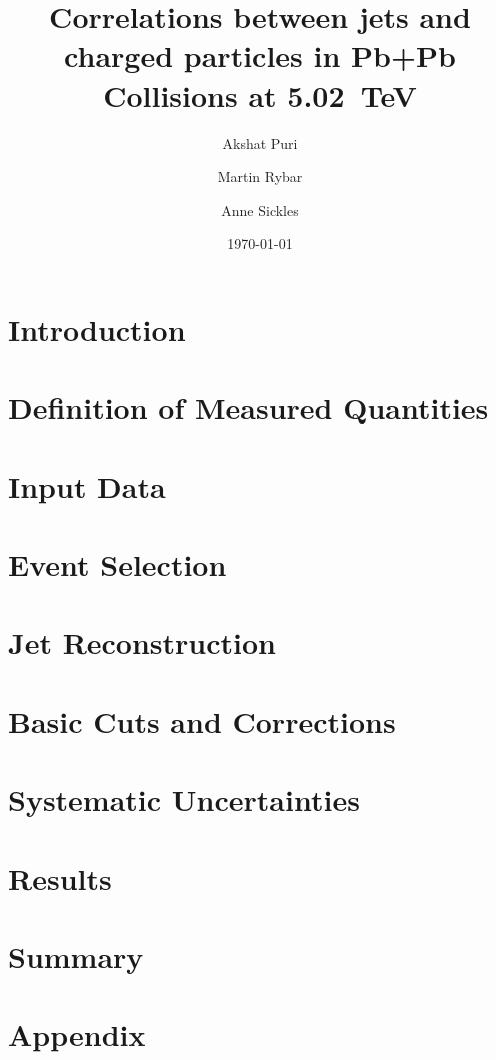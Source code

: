 \documentclass[11pt,a4paper]{atlasnote}
\title{Correlations between jets and charged particles in Pb+Pb Collisions at 5.02~TeV}
\author[a]{Akshat Puri}
\author[a]{Martin Rybar}
\author[a]{Anne Sickles}
\affil[a]{University of Illinois at Urbana-Champaign}
\date{\today}
\begin{document}
\newpage

\tableofcontents
\newpage

\section{Introduction}
\label{sec:intro}

\section{Definition of Measured Quantities}
\label{sec:trkjet_corr_measurement}

\clearpage
\section{Input Data}
\label{sec:used_data}

\section{Event Selection }
\label{sec:event_selection}

\clearpage
\section{Jet Reconstruction}
\label{sec:reconstruction}

\clearpage
\section{Basic Cuts and Corrections}
\label{sec:cuts_corrections}

\clearpage
\section{Systematic Uncertainties}
\label{Sec:systematic}

\clearpage
\section{Results}
\label{sec:results}

\clearpage
\section{Summary}
\label{sec:summary}

\clearpage\appendix
\section{Appendix}
\label{sec:appendixA}

\clearpage

\clearpage


\clearpage


\appendix
\end{document}
